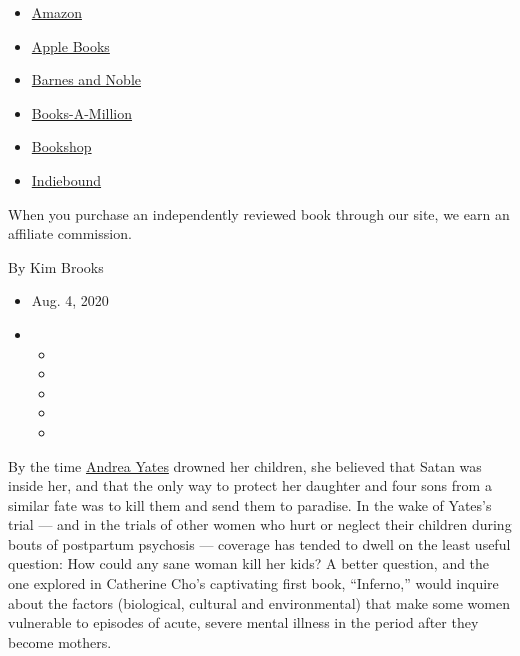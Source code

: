 \begin{itemize}
\tightlist
\item
  \href{https://www.amazon.com/gp/search?index=books\&tag=NYTBSREV-20\&field-keywords=Inferno\%3A+A+Memoir+of+Motherhood+and+Madness+Catherine+Cho}{Amazon}
\item
  \href{https://du-gae-books-dot-nyt-du-prd.appspot.com/buy?title=Inferno\%3A+A+Memoir+of+Motherhood+and+Madness\&author=Catherine+Cho}{Apple
  Books}
\item
  \href{https://www.anrdoezrs.net/click-7990613-11819508?url=https\%3A\%2F\%2Fwww.barnesandnoble.com\%2Fw\%2F\%3Fean\%3D9781250623713}{Barnes
  and Noble}
\item
  \href{https://www.anrdoezrs.net/click-7990613-35140?url=https\%3A\%2F\%2Fwww.booksamillion.com\%2Fp\%2FInferno\%253A\%2BA\%2BMemoir\%2Bof\%2BMotherhood\%2Band\%2BMadness\%2FCatherine\%2BCho\%2F9781250623713}{Books-A-Million}
\item
  \href{https://bookshop.org/a/3546/9781250623713}{Bookshop}
\item
  \href{https://www.indiebound.org/book/9781250623713?aff=NYT}{Indiebound}
\end{itemize}

When you purchase an independently reviewed book through our site, we
earn an affiliate commission.

By Kim Brooks

\begin{itemize}
\item
  Aug. 4, 2020
\item
  \begin{itemize}
  \item
  \item
  \item
  \item
  \item
  \end{itemize}
\end{itemize}

By the time
\href{https://www.nytimes3xbfgragh.onion/2001/09/08/us/despair-plagued-mother-held-in-children-s-deaths.html}{Andrea
Yates} drowned her children, she believed that Satan was inside her, and
that the only way to protect her daughter and four sons from a similar
fate was to kill them and send them to paradise. In the wake of Yates's
trial --- and in the trials of other women who hurt or neglect their
children during bouts of postpartum psychosis --- coverage has tended to
dwell on the least useful question: How could any sane woman kill her
kids? A better question, and the one explored in Catherine Cho's
captivating first book, ``Inferno,'' would inquire about the factors
(biological, cultural and environmental) that make some women vulnerable
to episodes of acute, severe mental illness in the period after they
become mothers.

